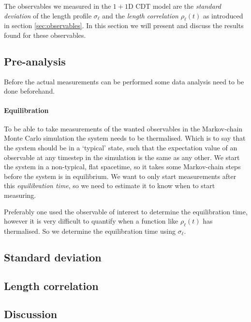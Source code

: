 The observables we measured in the $1 + 1$D CDT model are the \emph{standard deviation} of the length profile $\sigma_\ell$ and the \emph{length correlation} $\rho_\ell(t)$ as introduced in section \ref{sec:observables}.
In this section we will present and discuss the results found for these observables.

\subsection{Pre-analysis}
Before the actual measurements can be performed some data analysis need to be done beforehand.

\paragraph{Equilibration}
To be able to take measurements of the wanted observables in the Markov-chain Monte Carlo simulation the system needs to be thermalised. Which is to say that the system should be in a `typical' state, such that the expectation value of an observable at any timestep in the simulation is the same as any other.
We start the system in a non-typical, flat spacetime, so it takes some Markov-chain steps before the system is in equilibrium.
We want to only start measurements after this \emph{equilibration time}, so we need to estimate it to know when to start measuring.

Preferably one used the observable of interest to determine the equilibration time, however it is very difficult to quantify when a function like $\rho_\ell(t)$ has thermalised. So we determine the equilibration time using $\sigma_\ell$.


\subsection{Standard deviation}

\subsection{Length correlation}

\subsection{Discussion}
